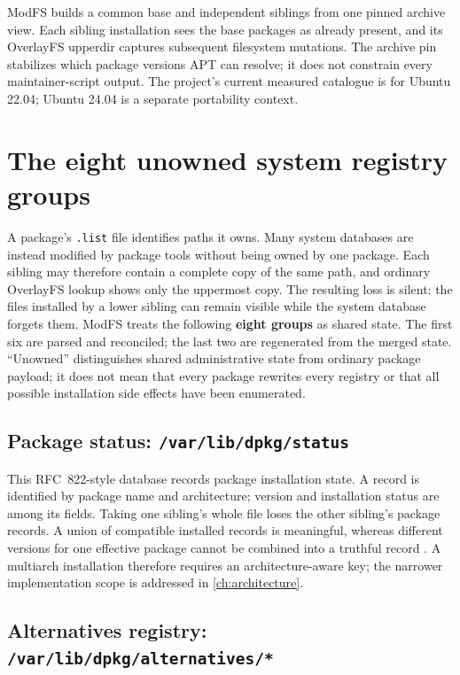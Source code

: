 ModFS builds a common base and independent siblings from one pinned archive view. Each sibling installation sees the base packages as already present, and its OverlayFS upperdir captures subsequent filesystem mutations. The archive pin stabilizes which package versions \ac{APT} can resolve; it does not constrain every maintainer-script output. The project's current measured catalogue is for Ubuntu \num{22.04}; Ubuntu \num{24.04} is a separate portability context.

\section{The eight unowned system registry groups}

A package's \texttt{.list} file identifies paths it owns. Many system databases are instead modified by package tools without being owned by one package. Each sibling may therefore contain a complete copy of the same path, and ordinary OverlayFS lookup shows only the uppermost copy. The resulting loss is silent: the files installed by a lower sibling can remain visible while the system database forgets them. ModFS treats the following \textbf{eight groups} as shared state. The first six are parsed and reconciled; the last two are regenerated from the merged state. ``Unowned'' distinguishes shared administrative state from ordinary package payload; it does not mean that every package rewrites every registry or that all possible installation side effects have been enumerated.

\subsection{Package status: \texttt{/var/lib/dpkg/status}}

This \ac{RFC}~\num{822}-style database records package installation state. A record is identified by package name and architecture; version and installation status are among its fields. Taking one sibling's whole file loses the other sibling's package records. A union of compatible installed records is meaningful, whereas different versions for one effective package cannot be combined into a truthful record \autocite{man-dpkg}. A multiarch installation therefore requires an architecture-aware key; the narrower implementation scope is addressed in \cref{ch:architecture}.

\subsection{Alternatives registry: \texttt{/var/lib/dpkg/alternatives/*}}

